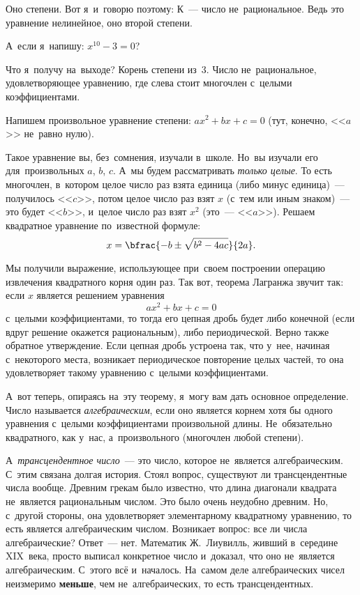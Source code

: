 Оно  степени. Вот я~и~говорю поэтому: К~--- число не~рациональное. Ведь это уравнение нелинейное,
оно второй степени.

А~если я~напишу: $x^{10}-3=0$?

Что я~получу на~выходе? Корень  степени из~3. Число не~рациональное, удовлетворяющее
уравнению, где слева стоит многочлен с~целыми коэффициентами.

\pagebreak

Напишем произвольное уравнение  степени: $ax^{2}+bx+c=0$ (тут, конечно, <<$a$>> не~равно нулю).

Такое уравнение вы, без~сомнения, изучали в~школе. Но~вы изучали его для~произвольных $a$, $b$, $c$. А~мы
будем рассматривать \textit{только целые}. То есть многочлен, в~котором целое число раз взята единица (либо
минус единица)~--- получилось <<$c$>>, потом целое число раз взят $x$ (с~тем или иным знаком)~--- это
будет <<$b$>>, и~целое число раз взят $x^{2}$ (это~--- <<$a$>>). Решаем квадратное уравнение по~известной
формуле:
$$
x=\bfrac{-b\pm\sqrt{b^{2}-4ac}}{2a}.
$$

Мы получили выражение, использующее при~своем построении операцию извлечения квадратного корня один
раз. Так вот, теорема Лагранжа звучит так: если $x$ является решением уравнения $$ax^{2}+bx+c=0$$
с~целыми коэффициентами, то тогда его цепная дробь будет либо конечной (если вдруг решение окажется
рациональным), либо периодической. Верно также обратное утверждение. Если цепная дробь устроена
так, что у~нее, начиная с~некоторого места, возникает периодическое повторение целых частей, то она
удовлетворяет такому уравнению с~целыми коэффициентами.

А~вот теперь, опираясь на~эту теорему, я~могу вам дать основное определение. Число называется
\textit{алгебраическим}, если оно является корнем хотя бы одного уравнения с~целыми коэффициентами
произвольной длины. Не~обязательно квадратного, как у~нас, а~произвольного (многочлен любой
степени).

А~\textit{трансцендентное число}~--- это число, которое не~является алгебраическим. С~этим связана долгая
история. Стоял вопрос, существуют ли трансцендентные числа вообще. Древним грекам было известно,
что длина диагонали квадрата не~является рациональным числом. Это было очень неудобно древним. Но,
с~другой стороны, она удовлетворяет элементарному квадратному уравнению, то есть является
алгебраическим числом. Возникает вопрос: все ли числа алгебраические? Ответ~--- нет. Математик Ж.~Лиувилль,
живший в~середине XIX~века, просто выписал конкретное число и~доказал, что оно
не~является алгебраическим. С~этого всё и~началось. На~самом деле алгебраических чисел неизмеримо
\textbf{меньше}, чем не~алгебраических, то есть трансцендентных.

